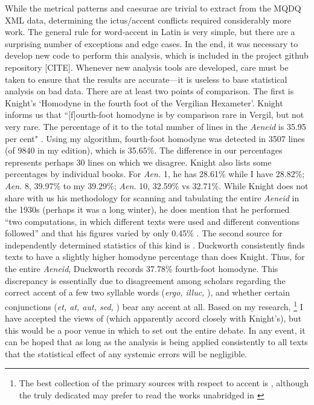 \documentclass[11pt,a4paper]{scrartcl} %
\begin{document}
{While the metrical patterns and caesurae are trivial to extract from the MQDQ XML data, determining the ictus/accent conflicts required considerably more work. The general rule for word-accent in Latin is very simple, but there are a surprising number of exceptions and edge cases. In the end, it was necessary to develop new code to perform this analysis, which is included in the project github repository [CITE]. Whenever new analysis tools are developed, care must be taken to ensure that the results are accurate---it is useless to base statistical analysis on bad data. There are at least two points of comparison. The first is Knight's `Homodyne in the fourth foot of the Vergilian Hexameter'. Knight informs us that ``[f]ourth-foot homodyne is by comparison rare in Vergil, but not very rare. The percentage of it to the total number of lines in the \textit{Aeneid} is 35.95 per cent" \cite[186]{knight_homodyne_1931}. Using my algorithm, fourth-foot homodyne was detected in 3507 lines (of 9840 in my edition), which is 35.65\%. The difference in our percentages represents perhaps 30 lines on which we disagree. Knight also lists some percentages by individual books. For \textit{Aen.} 1, he has 28.61\% while I have 28.82\%; \textit{Aen.} 8, 39.97\% to my 39.29\%; \textit{Aen.} 10, 32.59\% vs 32.71\%. While Knight does not share with us his methodology for scanning and tabulating the entire \textit{Aeneid} in the 1930s (perhaps it was a long winter), he does mention that he performed ``two computations, in which different texts were used and different conventions followed'' and that his figures varied by only 0.45\% \cite[186 n. 1]{knight_homodyne_1931}. The second source for independently determined statistics of this kind is . Duckworth consistently finds texts to have a slightly higher homodyne percentage than does Knight. Thus, for the entire \textit{Aeneid}, Duckworth records 37.78\% fourth-foot homodyne. This discrepancy is essentially due to disagreement among scholars regarding the correct accent of a few two syllable words (\textit{ergo, illuc,} \textellipsis), and whether certain conjunctions (\textit{et, at, aut, sed,} \textellipsis) bear any accent at all. Based on my research,%
\footnote{The best collection of the primary sources with respect to accent is \cite{schoell_accentu_1876}, although the truly dedicated may prefer to read the works unabridged in \cite{keil_heinrich_grammatici_1857}}
I have accepted the views of  (which apparently accord closely with Knight's), but this would be a poor venue in which to set out the entire debate. In any event, it can be hoped that as long as the analysis is being applied consistently to all texts that the statistical effect of any systemic errors will be negligible.

}
\end{document}
